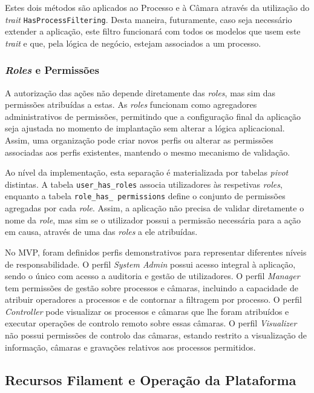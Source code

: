 Estes dois métodos são aplicados ao Processo e à Câmara através da utilização do \textit{trait} \texttt{HasProcessFiltering}. Desta maneira, futuramente, caso seja necessário extender a aplicação, este filtro funcionará com todos os modelos que usem este \textit{trait} e que, pela lógica de negócio, estejam associados a um processo.


\subsubsection{\textit{Roles} e Permissões}

A autorização das ações não depende diretamente das \textit{roles}, mas sim das permissões atribuídas a estas. As \textit{roles} funcionam como agregadores administrativos de permissões, permitindo que a configuração final da aplicação seja ajustada no momento de implantação sem alterar a lógica aplicacional. Assim, uma organização pode criar novos perfis ou alterar as permissões associadas aos perfis existentes, mantendo o mesmo mecanismo de validação.

Ao nível da implementação, esta separação é materializada por tabelas \textit{pivot} distintas. A tabela \texttt{user\_has\_roles} associa utilizadores às respetivas \textit{roles}, enquanto a tabela \texttt{role\_has\_ permissions} define o conjunto de permissões agregadas por cada \textit{role}. Assim, a aplicação não precisa de validar diretamente o nome da \textit{role}, mas sim se o utilizador possui a permissão necessária para a ação em causa, através de uma das \textit{roles} a ele atribuídas.

No \gls{MVP}, foram definidos perfis demonstrativos para representar diferentes níveis de responsabilidade. O perfil \textit{System Admin} possui acesso integral à aplicação, sendo o único com acesso a auditoria e gestão de utilizadores. O perfil \textit{Manager} tem permissões de gestão sobre processos e câmaras, incluindo a capacidade de atribuir operadores a processos e de contornar a filtragem por processo. O perfil \textit{Controller} pode visualizar os processos e câmaras que lhe foram atribuídos e executar operações de controlo remoto sobre essas câmaras. O perfil \textit{Visualizer} não possui permissões de controlo das câmaras, estando restrito a visualização de informação, câmaras e gravações relativos aos processos permitidos.


\subsection{Recursos Filament e Operação da Plataforma}

